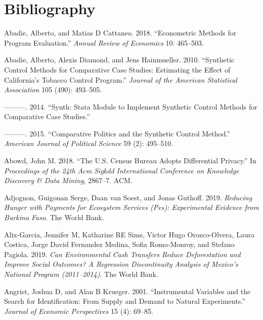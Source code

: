 \documentclass[
]{book}
\begin{document}
\hypertarget{bibliography}{%
\chapter*{Bibliography}\label{bibliography}}

\hypertarget{refs}{}
\leavevmode\hypertarget{ref-abadie2018econometric}{}%
Abadie, Alberto, and Matias D Cattaneo. 2018. ``Econometric Methods for Program Evaluation.'' \emph{Annual Review of Economics} 10: 465--503.

\leavevmode\hypertarget{ref-abadie2010synthetic}{}%
Abadie, Alberto, Alexis Diamond, and Jens Hainmueller. 2010. ``Synthetic Control Methods for Comparative Case Studies: Estimating the Effect of California's Tobacco Control Program.'' \emph{Journal of the American Statistical Association} 105 (490): 493--505.

\leavevmode\hypertarget{ref-abadie2014synth}{}%
---------. 2014. ``Synth: Stata Module to Implement Synthetic Control Methods for Comparative Case Studies.''

\leavevmode\hypertarget{ref-abadie2015comparative}{}%
---------. 2015. ``Comparative Politics and the Synthetic Control Method.'' \emph{American Journal of Political Science} 59 (2): 495--510.

\leavevmode\hypertarget{ref-abowd2018us}{}%
Abowd, John M. 2018. ``The U.S. Census Bureau Adopts Differential Privacy.'' In \emph{Proceedings of the 24th Acm Sigkdd International Conference on Knowledge Discovery \& Data Mining}, 2867--7. ACM.

\leavevmode\hypertarget{ref-adjognon2019reducing}{}%
Adjognon, Guigonan Serge, Daan van Soest, and Jonas Guthoff. 2019. \emph{Reducing Hunger with Payments for Ecosystem Services (Pes): Experimental Evidence from Burkina Faso}. The World Bank.

\leavevmode\hypertarget{ref-alix2019can}{}%
Alix-Garcia, Jennifer M, Katharine RE Sims, Victor Hugo Orozco-Olvera, Laura Costica, Jorge David Fernandez Medina, Sofia Romo-Monroy, and Stefano Pagiola. 2019. \emph{Can Environmental Cash Transfers Reduce Deforestation and Improve Social Outcomes? A Regression Discontinuity Analysis of Mexico's National Program (2011--2014)}. The World Bank.

\leavevmode\hypertarget{ref-angrist2001instrumental}{}%
Angrist, Joshua D, and Alan B Krueger. 2001. ``Instrumental Variables and the Search for Identification: From Supply and Demand to Natural Experiments.'' \emph{Journal of Economic Perspectives} 15 (4): 69--85.
\end{document}
